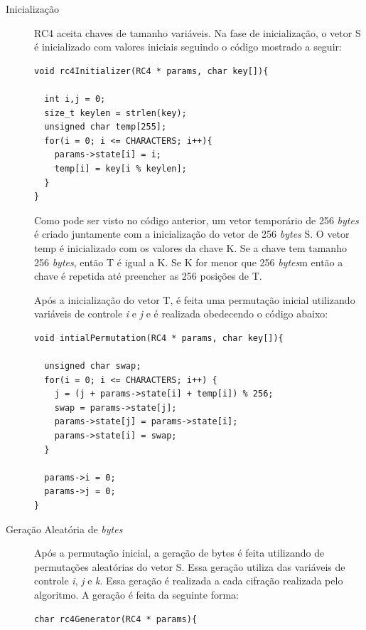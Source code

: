 \begin{description}

	\item [Inicialização] RC4 aceita chaves de tamanho variáveis. Na fase de inicialização, o vetor S é inicializado com valores iniciais seguindo o código mostrado a seguir:
	
    \begin{lstlisting}[caption={Código Inicialização}, label=inicialization]
void rc4Initializer(RC4 * params, char key[]){

  int i,j = 0;
  size_t keylen = strlen(key);
  unsigned char temp[255];
  for(i = 0; i <= CHARACTERS; i++){
    params->state[i] = i;
    temp[i] = key[i % keylen];
  }
}
    \end{lstlisting}

Como pode ser visto no código anterior, um vetor temporário de 256 \textit{bytes} é criado juntamente com a inicialização do vetor de 256 \textit{bytes} S. O vetor temp é inicializado com os valores da chave K. Se a chave tem tamanho 256 \textit{bytes}, então T é igual a K. Se K for menor que 256 \textit{bytes}m então a chave é repetida até preencher as 256 posições de T.

Após a inicialização do vetor T, é feita uma permutação inicial utilizando variáveis de controle \textit{i} e \textit{j} e é realizada obedecendo o código abaixo:

    \begin{lstlisting}[caption={Código Permutação Inicial}, label=initialPermutation]
void intialPermutation(RC4 * params, char key[]){

  unsigned char swap;
  for(i = 0; i <= CHARACTERS; i++) {
    j = (j + params->state[i] + temp[i]) % 256;
    swap = params->state[j];
    params->state[j] = params->state[i];
    params->state[i] = swap;
  }

  params->i = 0;
  params->j = 0;
}
    \end{lstlisting}

	\item [Geração Aleatória de \textit{bytes}] Após a permutação inicial, a geração de bytes é feita utilizando de permutações aleatórias do vetor S. Essa geração utiliza das variáveis de controle \textit{i}, \textit{j} e \textit{k}. Essa geração é realizada a cada cifração realizada pelo algoritmo. A geração é feita da seguinte forma:
	
    \begin{lstlisting}[caption={Código Geração Aleatório de \textit{bytes}}, label=randomGeneration]
char rc4Generator(RC4 * params){


\end{lstlisting}
\end{description}
